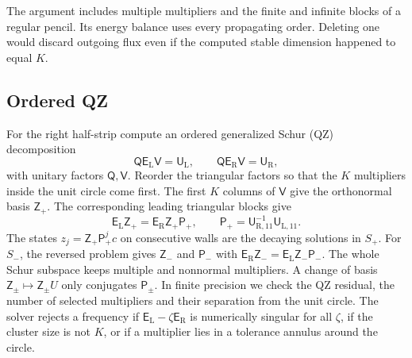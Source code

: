 The argument includes multiple multipliers and the finite and infinite
blocks of a regular pencil. Its energy balance uses every propagating
order. Deleting one would discard outgoing flux even if the computed
stable dimension happened to equal $K$.

\subsection{Ordered QZ}\label{sec:qz}
For the right half-strip compute an ordered generalized Schur (QZ)
decomposition
\[
 \mathsf Q\mathsf E_{\mathrm L}\mathsf V=\mathsf U_{\mathrm L},
 \qquad
 \mathsf Q\mathsf E_{\mathrm R}\mathsf V=\mathsf U_{\mathrm R},
\]
with unitary factors $\mathsf Q,\mathsf V$. Reorder the triangular factors
so that the $K$ multipliers inside the unit circle come first. The first
$K$ columns of $\mathsf V$ give the orthonormal basis $\mathsf Z_+$.
The corresponding leading triangular blocks give
\begin{equation}\label{eq:propagation}
  \mathsf E_{\mathrm L}\mathsf Z_+=\mathsf E_{\mathrm R}\mathsf Z_+\mathsf P_+,\qquad
  \mathsf P_+=\mathsf U_{\mathrm R,11}^{-1}\mathsf U_{\mathrm L,11}.
\end{equation}
The states $z_j=\mathsf Z_+\mathsf P_+^jc$ on consecutive walls are the decaying
solutions in $S_+$. For $S_-$, the reversed problem gives $\mathsf Z_-$
and $\mathsf P_-$ with $\mathsf E_{\mathrm R}\mathsf Z_-=\mathsf E_{\mathrm L}\mathsf Z_-\mathsf P_-$. The
whole Schur subspace keeps multiple and nonnormal multipliers. A change of
basis $\mathsf Z_\pm\mapsto\mathsf Z_\pm U$ only conjugates $\mathsf P_\pm$. In finite precision we check the QZ residual, the number of selected
multipliers and their separation from the unit circle. The solver
rejects a frequency if $\mathsf E_{\mathrm L}-\zeta\mathsf E_{\mathrm R}$ is
numerically singular for all $\zeta$, if the cluster size is not $K$, or if a multiplier lies in a
tolerance annulus around the circle.
